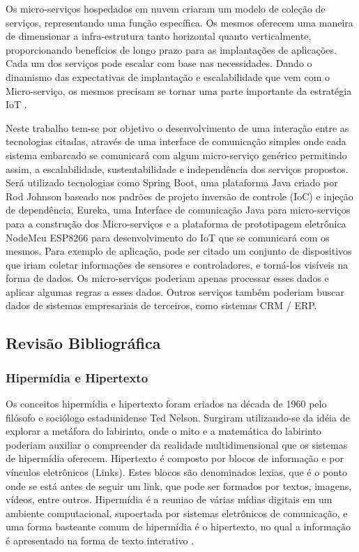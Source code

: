 \documentclass[journal]{IEEEtran}
\begin{document}
Os micro-serviços hospedados em nuvem criaram um modelo de coleção de serviços, representando uma função específica. Os mesmos oferecem uma maneira de dimensionar a infra-estrutura tanto horizontal quanto verticalmente, proporcionando benefícios de longo prazo para as implantações de aplicações. Cada um dos serviços pode escalar com base nas necessidades. Dando o dinamismo das expectativas de implantação e escalabilidade que vem com o Micro-serviço, os mesmos precisam se tornar uma parte importante da estratégia IoT \cite{manutayal2016}.

Neste trabalho  tem-se por objetivo o desenvolvimento de uma interação entre as tecnologias citadas, através de uma interface de comunicação simples onde cada sistema embarcado se comunicará com algum micro-serviço genérico permitindo assim, a escalabilidade, sustentabilidade e independência dos serviços propostos. Será utilizado tecnologias como Spring Boot, uma plataforma Java criado por Rod Johnson baseado nos padrões de projeto inversão de controle (IoC) e injeção de dependência, Eureka, uma Interface de comunicação Java para micro-serviços para a construção dos Micro-serviços e a plataforma de prototipagem eletrônica NodeMcu ESP8266 para desenvolvimento do IoT que se comunicará com os mesmos. Para exemplo de aplicação, pode ser citado  um conjunto de dispositivos que iriam coletar informações de sensores e controladores, e torná-los visíveis na forma de dados. Os micro-serviços poderiam apenas processar esses dados e aplicar algumas regras a esses dados. Outros serviços também poderiam buscar dados de sistemas empresariais de terceiros, como sistemas CRM / ERP.



\subsection{Revisão Bibliográfica}
\subsubsection{Hipermídia e Hipertexto}
Os conceitos hipermídia e hipertexto foram criados na década de 1960 pelo filósofo e sociólogo estadunidense Ted Nelson. Surgiram utilizando-se da idéia de explorar a metáfora do labirinto, onde o mito e a matemática do labirinto poderiam auxiliar o compreender da realidade multidimensional que os sistemas de hipermídia oferecem. Hipertexto é composto por blocos de informação e por vínculos eletrônicos (Links). Estes blocos são denominados lexias, que é o ponto onde se está antes de seguir um link, que pode ser formados por textos, imagens, vídeos, entre outros. Hipermídia é a reuniao de várias mídias digitais em um ambiente computacional, supoertada por sistemas eletrônicos de comunicação, e uma forma basteante comum de hipermídia é o hipertexto, no qual a informação é apresentado na forma de texto interativo \cite{lillianhiper}.
\end{document}
